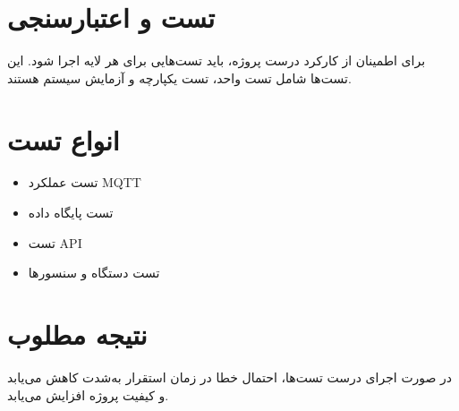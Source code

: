 \section{تست و اعتبارسنجی}

برای اطمینان از کارکرد درست پروژه، باید تست‌هایی برای هر لایه اجرا شود. این تست‌ها شامل تست واحد، تست یکپارچه و آزمایش سیستم هستند.

\section{انواع تست}

\begin{itemize}
    \item تست عملکرد MQTT
    \item تست پایگاه داده
    \item تست API
    \item تست دستگاه و سنسورها
\end{itemize}

\section{نتیجه مطلوب}

در صورت اجرای درست تست‌ها، احتمال خطا در زمان استقرار به‌شدت کاهش می‌یابد و کیفیت پروژه افزایش می‌یابد.
